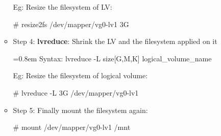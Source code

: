 \begin{flushleft}
\begin{itemize}
\begin{itemize}
		Eg: Resize the filesystem of LV:
		\begin{tcolorbox}[breakable,notitle,boxrule=-0pt,colback=black,colframe=black]
			\color{green}
			\font=9pt
			\# resize2fs /dev/mapper/vg0-lv1 3G
			\font=4pt
		\end{tcolorbox}
		
		\item Step 4:
		\newline
		\textbf{lvreduce}: Shrink the LV and the filesystem applied on it
		\begin{tcolorbox}[breakable,notitle,boxrule=-0pt,colback=pink,colframe=pink]
			\color{black}
			\font=0.8em
			Syntax: lvreduce -L size[G,M,K] logical\_volume\_name
			\font=4pt
		\end{tcolorbox}
		
		Eg: Resize the filesystem of logical volume:
		\begin{tcolorbox}[breakable,notitle,boxrule=-0pt,colback=black,colframe=black]
			\color{green}
			\font=9pt
			\# lvreduce -L 3G /dev/mapper/vg0-lv1
			\font=4pt
		\end{tcolorbox}
		
		\item Step 5:
		\newline
		Finally mount the filesystem again:
		\begin{tcolorbox}[breakable,notitle,boxrule=-0pt,colback=black,colframe=black]
			\color{green}
			\font=9pt
			\# mount /dev/mapper/vg0-lv1  /mnt
			\font=4pt
		\end{tcolorbox}
		
	\end{itemize}

	
	\end{itemize}

	
\end{flushleft}
\newpage
	
